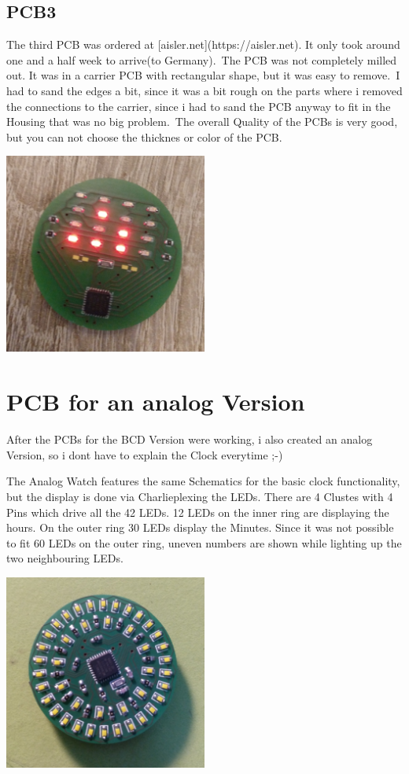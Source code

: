 \documentclass[12pt,a4paper,final]{article}
\begin{document}
\subsection{PCB3}
The third PCB was ordered at [aisler.net](https://aisler.net). It only took around one and a half week to arrive(to Germany).\
The PCB was not completely milled out. It was in a carrier PCB with rectangular shape, but it was easy to remove.\
I had to sand the edges a bit, since it was a bit rough on the parts where i removed the connections to the carrier, since i had to sand the PCB anyway to fit in the Housing that was no big problem.\
The overall Quality of the PCBs is very good, but you can not choose the thicknes or color of the PCB.\
\begin{center}
  \includegraphics[width=0.5\textwidth]{../Pictures/PCB3.jpg}
\end{center}

\section{PCB for an analog Version}
After the PCBs for the BCD Version were working, i also created an analog Version, so i dont have to explain the Clock everytime ;-)

The Analog Watch features the same Schematics for the basic clock functionality, but the display is done via Charlieplexing the LEDs. There are 4 Clustes with 4 Pins which drive all the 42 LEDs. 12 LEDs on the inner ring are displaying the hours. On the outer ring 30 LEDs display the Minutes. Since it was not possible to fit 60 LEDs on the outer ring, uneven numbers are shown while lighting up the two neighbouring LEDs.
\begin{center}
  \includegraphics[width=0.5\textwidth]{../Pictures/AnalogPCB.jpg}
\end{center}
\end{document}
